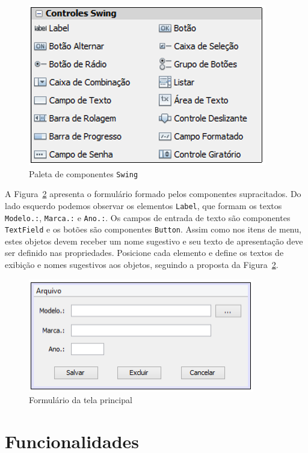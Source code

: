 \begin{figure}[h]
	\centering
	\includegraphics[width=0.4\textheight]{img/gui-paleta}
	\caption{Paleta de componentes \texttt{Swing}}
	\label{fig:gui-paleta}
\end{figure}

A Figura~\ref{fig:gui-formulario} apresenta o formulário formado pelos componentes supracitados. Do lado esquerdo podemos observar os elementos \texttt{Label}, que formam os textos \texttt{Modelo.:}, \texttt{Marca.:} e \texttt{Ano.:}. Os campos de entrada de texto são componentes \texttt{TextField} e os botões são componentes \texttt{Button}. Assim como nos itens de menu, estes objetos devem receber um nome sugestivo e seu texto de apresentação deve ser definido nas propriedades. Posicione cada elemento e define os textos de exibição e nomes sugestivos aos objetos, seguindo a proposta da Figura~\ref{fig:gui-formulario}.

\begin{figure}[h]
	\centering
	\includegraphics[width=0.4\textheight]{img/gui-formulario}
	\caption{Formulário da tela principal}
	\label{fig:gui-formulario}
\end{figure}

\section{Funcionalidades}

